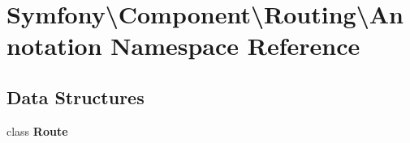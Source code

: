 \section{Symfony\textbackslash{}Component\textbackslash{}Routing\textbackslash{}Annotation Namespace Reference}
\label{namespace_symfony_1_1_component_1_1_routing_1_1_annotation}
\subsection*{Data Structures}
\begin{DoxyCompactItemize}
\item 
class {\bf Route}
\end{DoxyCompactItemize}
